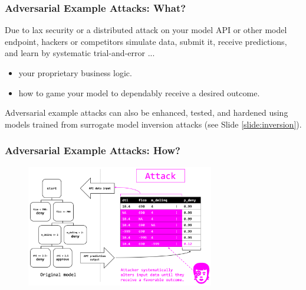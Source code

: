 \documentclass[11pt,
               aspectratio=169,
               hyperref={colorlinks}
               ]{beamer}
\begin{document}
			\begin{frame}
		
				\frametitle{Adversarial Example Attacks: \textbf{What?}}		

Due to lax security or a distributed attack on your model API or other model endpoint, hackers or competitors simulate data, submit it, receive predictions, and learn by systematic trial-and-error ... 		
				\begin{itemize}
					\item your proprietary business logic.
					\item how to game your model to dependably receive a desired outcome. 
				\end{itemize}
				\vspace{10pt}
Adversarial example attacks can also be enhanced, tested, and hardened using models trained from surrogate model inversion attacks (see Slide \ref{slide:inversion}).

			\end{frame}	
	
			\begin{frame}[label={slide:adversary}]
		
				\frametitle{Adversarial Example Attacks: \textbf{How?}}		
			
				\begin{figure}[htb]
					\begin{center}
						\includegraphics[height=150pt]{../img/adversary.PNG}
					\end{center}
				\end{figure}	

			\end{frame}	
			
\end{document}
